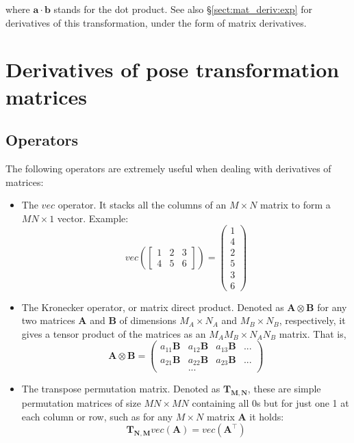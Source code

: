 \documentclass[a4paper,11pt]{report}
\begin{document}
\noindent where $\mathbf{a} \cdot \mathbf{b}$ stands for the dot product. 
See also \S\ref{sect:mat_deriv:exp} for derivatives of this transformation, 
under the form of matrix derivatives.


\chapter{Derivatives of pose transformation matrices}
\label{chap:mat_deriv}

\section{Operators}
\label{sect:mat_deriv:ops}

The following operators are extremely useful when dealing with derivatives of matrices:

\begin{itemize}
\item{The $vec$ operator. It stacks all the columns of an $M \times N$ matrix to form a $MN\times 1$ vector. 
Example:
\begin{equation}
  vec\left( \left[
    \begin{array}{ccc}
      1 & 2 & 3 \\
      4 & 5 & 6
    \end{array}
 \right] \right) = 
\left(
\begin{array}{c}
1 \\ 4 \\ 2 \\ 5 \\ 3 \\ 6
\end{array}
\right)
\end{equation}
}
\item{The Kronecker operator, or matrix direct product. 
Denoted as $\mathbf{A} \otimes \mathbf{B}$ for any two matrices 
$\mathbf{A}$ and $\mathbf{B}$ of dimensions $M_A \times N_A$
and $M_B \times N_B$, respectively, 
it gives a tensor product of the matrices as an $M_AM_B \times N_A N_B$ matrix. 
That is,
\begin{equation}
 \mathbf{A} \otimes \mathbf{B} 
 = 
\left(
\begin{array}{cccc}
a_{11} \mathbf{B}  & a_{12} \mathbf{B} & a_{13} \mathbf{B}  & ... \\
a_{21} \mathbf{B}  & a_{22} \mathbf{B} & a_{23} \mathbf{B}  & ... \\
 & ... & 
\end{array}
\right)
\end{equation}
}
\item{The transpose permutation matrix. Denoted as $\mathbf{T_{M,N}}$, 
these are simple permutation matrices of size $MN \times MN$ containing all 0s 
but for just one 1 at each column or row, 
such as for any $M \times N$ matrix $\mathbf{A}$ it holds:
\begin{equation}
\mathbf{T_{N,M}} vec(\mathbf{A}) = vec(\mathbf{A}^\top)
\end{equation}
}
\end{itemize}
\end{document}
